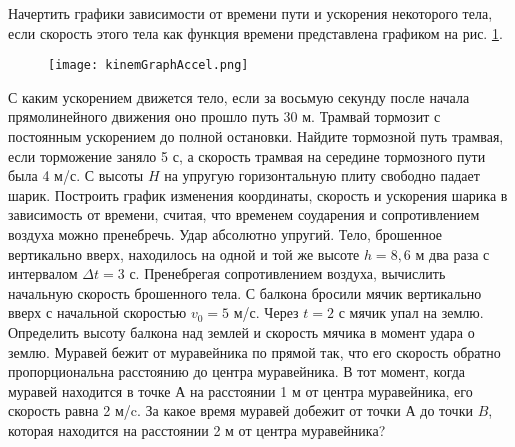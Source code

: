 \AddProb Начертить графики зависимости от времени пути и ускорения некоторого тела, если скорость этого тела как функция времени представлена графиком на рис. \ref{kinemGraphAccel}.
\begin{figure}
\centering
\texttt{[image: kinemGraphAccel.png]}
\caption{}
\label{kinemGraphAccel}
\end{figure}
\AddProb С каким ускорением движется тело, если за восьмую секунду после начала прямолинейного движения оно прошло путь 30 м.
\AddProb Трамвай тормозит с постоянным ускорением до полной остановки. Найдите тормозной путь трамвая, если торможение заняло 5 с, а скорость трамвая на середине тормозного пути была 4 м/с.
\AddProb С высоты $H$ на упругую горизонтальную плиту свободно падает шарик. Построить график изменения координаты, скорость и ускорения шарика в зависимость от времени, считая, что временем соударения и сопротивлением воздуха можно пренебречь. Удар абсолютно упругий.
\AddProb Тело, брошенное вертикально вверх, находилось на одной и той же высоте $h = 8,6$ м два раза с интервалом $\Delta t = 3$ с. Пренебрегая сопротивлением воздуха, вычислить начальную скорость брошенного тела.
\AddProb С балкона бросили мячик вертикально вверх с начальной скоростью $v_0 = 5$ м/с. Через $t = 2$ с мячик упал на землю. Определить высоту балкона над землей и скорость мячика в момент удара о землю.
\AddProb Муравей бежит от муравейника по прямой так, что его скорость обратно пропорциональна расстоянию до центра муравейника. В тот момент, когда муравей находится в точке $А$ на расстоянии 1 м от центра муравейника, его скорость равна 2 м/c. За какое время муравей добежит от точки А до точки $B$, которая находится на расстоянии 2 м от центра муравейника?

\clearpage